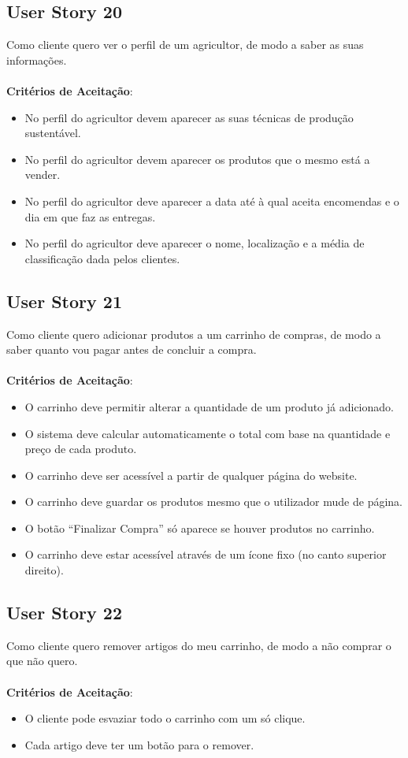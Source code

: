 \documentclass[a4paper,11pt]{article}
\begin{document}
\subsection{User Story 20}
Como cliente quero ver o perfil de um agricultor, de modo a saber as suas informações.\\\\
\textbf{Critérios de Aceitação}:
\begin{itemize}
  \item No perfil do agricultor devem aparecer as suas técnicas de produção sustentável.
  \item No perfil do agricultor devem aparecer os produtos que o mesmo está a vender.
  \item No perfil do agricultor deve aparecer a data até à qual aceita encomendas e o dia em que faz as entregas.
  \item No perfil do agricultor deve aparecer o nome, localização e a média de classificação dada pelos clientes.
\end{itemize}
\subsection{User Story 21}
Como cliente quero adicionar produtos a um carrinho de compras, de modo a saber quanto vou pagar antes de concluir a compra.\\\\
\textbf{Critérios de Aceitação}:
\begin{itemize}
  \item O carrinho deve permitir alterar a quantidade de um produto já adicionado.
  \item O sistema deve calcular automaticamente o total com base na quantidade e preço de cada produto.
  \item O carrinho deve ser acessível a partir de qualquer página do website.
  \item O carrinho deve guardar os produtos mesmo que o utilizador mude de página.
  \item O botão “Finalizar Compra” só aparece se houver produtos no carrinho.
  \item O carrinho deve estar acessível através de um ícone fixo (no canto superior direito).
\end{itemize}
\subsection{User Story 22}
Como cliente quero remover artigos do meu carrinho, de modo a não comprar o que não quero.\\\\
\textbf{Critérios de Aceitação}:
\begin{itemize}
  \item O cliente pode esvaziar todo o carrinho com um só clique.
  \item Cada artigo deve ter um botão para o remover.
\end{itemize}
\end{document}
